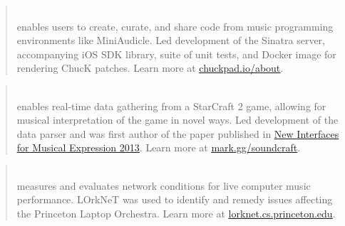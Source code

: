 

\begin{cvparagraph}


\begin{quote}
\\\leading{13pt} 
enables users to create, curate, and share code from music programming environments like MiniAudicle. Led development of the Sinatra server, accompanying iOS SDK library, suite of unit tests, and Docker image for rendering ChucK patches. Learn more at \href{chuckpad.io/about}{\underline{chuckpad.io/about}}.
\end{quote}

\begin{quote}
\\\leading{13pt}
enables real-time data gathering from a StarCraft 2 game, allowing for musical interpretation of the game in novel ways.
Led development of the data parser and was first author of the paper published in \href{http://www.nime.org/proceedings/2013/nime2013_146.pdf}{\underline{New Interfaces for Musical Expression 2013}}. Learn more at \href{mark.gg/soundcraft}{\underline{mark.gg/soundcraft}}.
\end{quote}

\begin{quote}
\\\leading{13pt}
measures and evaluates network conditions for live computer music performance.
LOrkNeT was used to identify and remedy issues affecting the Princeton Laptop Orchestra.
Learn more at \href{lorknet.cs.princeton.edu}{\underline{lorknet.cs.princeton.edu}}.
\end{quote}

\end{cvparagraph}
